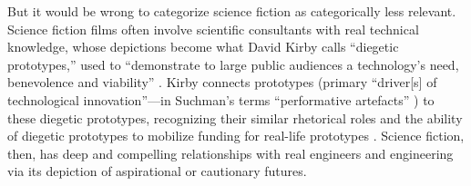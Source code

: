 
But it would be wrong to categorize science
fiction as categorically less relevant. Science fiction films
often involve scientific consultants with real
technical knowledge, whose depictions become what David
Kirby calls ``diegetic prototypes,'' used to ``demonstrate to
large public audiences a technology's need, benevolence and
viability'' \cite[p. 43]{kirbyFuture}. Kirby connects prototypes (primary
``driver[s] of technological innovation''---in
Suchman's terms ``performative artefacts'' \cite[p. 45]{kirbyFuture})
to these diegetic prototypes, 
recognizing their similar rhetorical roles and the
ability of diegetic prototypes to mobilize funding for real-life
prototypes \cite[p. 44-47]{kirbyFuture}. Science fiction, then, has deep
and compelling relationships with real engineers and engineering via
its depiction of aspirational or cautionary futures.





